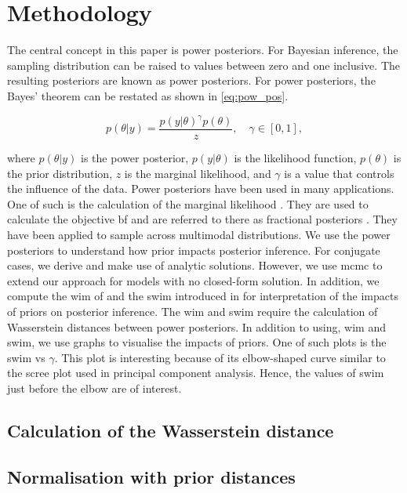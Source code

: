 \documentclass[12pt]{article}
\begin{document}
\section{Methodology}
The central concept in this paper is power posteriors. For Bayesian inference, the sampling distribution can be raised to values between zero and one inclusive. The resulting posteriors are known as power posteriors. For power posteriors, the Bayes' theorem can be restated as shown in \cref{eq:pow_pos}.

\begin{equation}
\label{eq:pow_pos}
p(\theta|y) =  \frac{p(y|\theta)^\gamma p(\theta)}{z}, \quad \gamma \in [0, 1],
\end{equation}

where $p(\theta|y)$ is the power posterior, $p(y|\theta)$ is the likelihood function, $p(\theta)$ is the prior distribution, $z$ is the marginal likelihood, and $\gamma$ is a value that controls the influence of the data. Power posteriors have been used in many applications. One of such is the calculation of the marginal likelihood \citep{friel2008marginal}. They are used to calculate the objective \gls{bf} and are referred to there as fractional posteriors \citep{ohaganPropertiesIntrinsicFractional1997}. They have been applied to sample across multimodal distributions. We use the power posteriors to understand how prior impacts posterior inference. For conjugate cases, we derive and make use of analytic solutions. However, we use \gls{mcmc} to extend our approach for models with no closed-form solution. In addition, we compute the \gls{wim} of \citep{ghaderinezhadWassersteinImpactMeasure2022} and the \gls{swim} introduced in for interpretation of the impacts of priors on posterior inference.  The \gls{wim} and \gls{swim} require the calculation of Wasserstein distances between power posteriors. In addition to using, \gls{wim} and \gls{swim}, we use graphs to visualise the impacts of priors. One of such plots is the \gls{swim} vs $\gamma$. This plot is interesting because of its elbow-shaped curve similar to the scree plot used in principal component analysis. Hence, the values of \gls{swim} just before the elbow are of interest.



\subsection{Calculation of the Wasserstein distance}

\subsection{Normalisation with prior distances}
\end{document}
